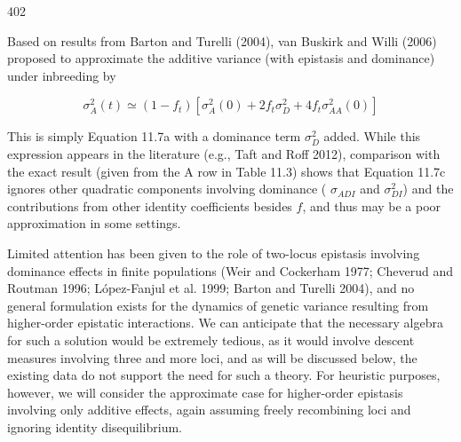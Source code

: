 \documentclass{article}
\begin{document}
402

Based on results from Barton and Turelli (2004), van Buskirk and Willi (2006) proposed to approximate the additive variance (with epistasis and dominance) under inbreeding by

\begin{equation}
\sigma_{A}^{2}(t)\simeq(1-f_{t})\left[\sigma_{A}^{2}(0)+2f_{t}\sigma_{D}^{2}+4f_{t}\sigma_{A A}^{2}(0)\right]
\tag{11.7c}
\label{eq:11_7c}
\end{equation}

This is simply Equation 11.7a with a dominance term  $ \sigma_D^2 $ added. While this expression appears in the literature (e.g., Taft and Roff 2012), comparison with the exact result (given from the A row in Table 11.3) shows that Equation 11.7c ignores other quadratic components involving dominance ( $ \sigma_{ADI} $ and  $ \sigma_{DI}^2 $) and the contributions from other identity coefficients besides  $ f $, and thus may be a poor approximation in some settings.

Limited attention has been given to the role of two-locus epistasis involving dominance effects in finite populations (Weir and Cockerham 1977; Cheverud and Routman 1996; López-Fanjul et al. 1999; Barton and Turelli 2004), and no general formulation exists for the dynamics of genetic variance resulting from higher-order epistatic interactions. We can anticipate that the necessary algebra for such a solution would be extremely tedious, as it would involve descent measures involving three and more loci, and as will be discussed below, the existing data do not support the need for such a theory. For heuristic purposes, however, we will consider the approximate case for higher-order epistasis involving only additive effects, again assuming freely recombining loci and ignoring identity disequilibrium.
\end{document}
